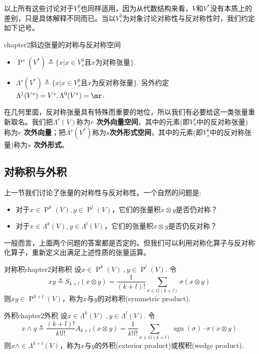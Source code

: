 以上所有这些讨论对于$V^{0}_{s}$也同样适用，因为从代数结构来看，$V$和$V^{\ast}$没有本质上的差别，只是具体解释不同而已。当以$V^{0}_{s}$为对象讨论对称性与反对称性时，我们约定如下记号。
\begin{mydef}{}{chapter2斜边张量的对称与反对称空间}
	\begin{itemize}
	\item $\operatorname{P}^{s}(V^{\ast})\triangleq\{x |x\in V^{0}_{s}\text{且} x\text{为对称张量} \}$.
	\item $\Lambda^{s}(V^{\ast})\triangleq \{x |x\in V^{0}_{s}\text{且} x\text{为反对称张量} \}$. 另外约定$\Lambda^{1}(V^{\ast})=V^{\ast},\Lambda^{0}(V^{\ast})=\mr$.
	\end{itemize}
\end{mydef}

在几何里面，反对称张量具有特殊而重要的地位，所以我们有必要给这一类张量重新取名。我们把$\Lambda^{r}(V)$称为\textbf{$r$ 次外向量空间}，其中的元素(即$V^{r}_{0}$中的反对称张量)称为\textbf{$r$ 次外向量}；把$\Lambda^{s}(V^{\ast})$称为\textbf{$s$次外形式空间}，其中的元素(即$V^{0}_{s}$中的反对称张量)称为\textbf{$s$ 次外形式}。

\subsection{对称积与外积}

上一节我们讨论了张量的对称性与反对称性。一个自然的问题是:
\begin{itemize}
\item 对于$x\in \operatorname{P}^{k}(V),y\in \operatorname{P}^{l}(V)$，它们的张量积$x\otimes 		  y$是否仍对称？
\item 对于$x\in \Lambda^{k}(V),y\in \Lambda^{l}(V)$，它们的张量积$x\otimes y$是否仍反对称？
\end{itemize}

一般而言，上面两个问题的答案都是否定的。但我们可以利用对称化算子与反对称化算子，重新定义出满足上述性质的张量运算。
\begin{mydef}{对称积}{chapter2对称积}
设$x\in \operatorname{P}^{k}(V)\;,y\in \operatorname{P}^{l}(V)$. 令
\[
xy\triangleq S_{k+l}\left( x\otimes y \right)=\frac{1}{(k+l)!}\sum_{\sigma\in G(k+l)}\sigma(x\otimes y)
\]
则$xy\in \operatorname{P}^{k+l}(V)$，称为$x$与$y$的对称积(symmetric product).
\end{mydef}

\begin{mydef}{外积}{chapter2外积}
	设$x\in \Lambda^{k}(V)\;,y\in \Lambda^{l}(V)$. 令
	\[
	x\wedge y\triangleq \frac{(k+l)!}{k!l!}A_{k+l}\left( x\otimes y \right)=\frac{1}{k!l!}\sum_{\sigma\in G(k+l)}\operatorname{sgn}(\sigma)\cdot \sigma(x\otimes y)
	\]
	则$x\wedge\in \Lambda^{k+l}(V)$，称为$x$与$y$的外积(exterior product)或楔积(wedge product).
\end{mydef}

